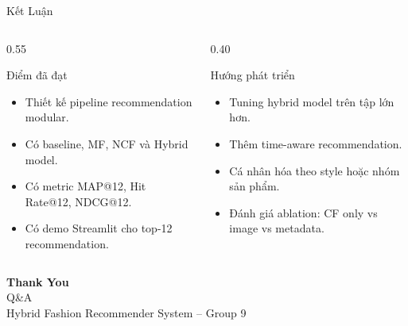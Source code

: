 \documentclass[aspectratio=169,10pt]{beamer}
\begin{document}
\begin{frame}{Kết Luận}
  \begin{columns}[T,totalwidth=\textwidth]
    \begin{column}{0.55\textwidth}
      \begin{block}{Điểm đã đạt}
        \begin{itemize}
          \item Thiết kế pipeline recommendation modular.
          \item Có baseline, MF, NCF và Hybrid model.
          \item Có metric MAP@12, Hit Rate@12, NDCG@12.
          \item Có demo Streamlit cho top-12 recommendation.
        \end{itemize}
      \end{block}
    \end{column}
    \begin{column}{0.40\textwidth}
      \begin{block}{Hướng phát triển}
        \begin{itemize}
          \item Tuning hybrid model trên tập lớn hơn.
          \item Thêm time-aware recommendation.
          \item Cá nhân hóa theo style hoặc nhóm sản phẩm.
          \item Đánh giá ablation: CF only vs image vs metadata.
        \end{itemize}
      \end{block}
    \end{column}
  \end{columns}
\end{frame}

\begin{frame}[plain]
  \vfill
  \centering
  {\color{white}\Huge\bfseries Thank You}\\[10pt]
  {\color{white}\Large Q\&A}\\[18pt]
  {\color{white}\normalsize Hybrid Fashion Recommender System -- Group 9}
  \vfill
\end{frame}
\end{document}
